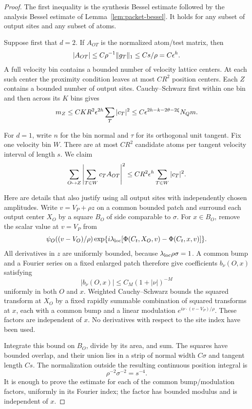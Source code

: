 \begin{proof}
The first inequality is the synthesis Bessel estimate followed by
the analysis Bessel estimate of Lemma~\ref{lem:packet-bessel}.
It holds for any subset of output sites and any subset of atoms.

Suppose first that \(d=2\).  If \(A_{OT}\) is the normalized
atom/test matrix, then
\[
 |A_{OT}|\leq C\rho^{-1}\|g_T\|_1
          \leq C s/\rho=C\epsilon^h.
\]
A full velocity bin contains a bounded number of velocity lattice
centers.  At each such center the proximity condition leaves at
most \(CR^2\) position centers.  Each \(Z\) contains a bounded
number of output sites.  Cauchy--Schwarz first within one bin
and then across its \(K\) bins gives
\[
 m_Z\leq CKR^2\epsilon^{2h}\sum_T|c_T|^2
       \leq C\epsilon^{2h-k-2\theta-2\xi}N_Qm.
\]

For \(d=1\), write \(n\) for the bin normal and \(\tau\) for its
orthogonal unit tangent.  Fix one velocity bin \(W\).
There are at most \(CR^2\) candidate atoms per tangent velocity
interval of length \(s\).  We claim
\begin{equation}
 \sum_{O\mapsto Z}\left|
       \sum_{T\in W}c_T A_{OT}\right|^2
 \leq CR^2\epsilon^h\sum_{T\in W}|c_T|^2.
 \label{eq:one-bin-strip}
\end{equation}

Here are details that also justify using all output sites with
independently chosen amplitudes.  Write \(v=V_P+\rho z\) on a
common bounded patch and surround each output center \(X_O\)
by a square \(B_O\) of side comparable to \(\sigma\).
For \(x\in B_O\), remove the scalar value at \(v=V_P\) from
\[
 \psi_O((v-V_O)/\rho)
 \exp\{i\lambda_{\rm loc}
       [\Phi(C_t,X_O,v)-\Phi(C_t,x,v)]\}.
\]
All derivatives in \(z\) are uniformly bounded, because
\(\lambda_{\rm loc}\rho\sigma=1\).
A common bump and a Fourier series on a fixed enlarged patch
therefore give coefficients \(b_\nu(O,x)\) satisfying
\[
 |b_\nu(O,x)|\leq C_M(1+|\nu|)^{-M}
\]
uniformly in both \(O\) and \(x\).
Weighted Cauchy--Schwarz bounds the squared transform at \(X_O\)
by a fixed rapidly summable combination of squared transforms
at \(x\), each with a common bump and a linear modulation
\(e^{i\nu\cdot(v-V_P)/\rho}\).
These factors are independent of \(x\).
No derivatives with respect to the site index have been used.

Integrate this bound on \(B_O\), divide by its area, and sum.
The squares have bounded overlap, and their union lies in a
strip of normal width \(C\sigma\) and tangent length \(Cs\).
The normalization outside the resulting continuous position
integral is
\begin{equation}
 \rho^{-2}\sigma^{-2}=s^{-4}.
 \label{eq:strip-normalization}
\end{equation}
It is enough to prove the estimate for each of the common
bump/modulation factors, uniformly in its Fourier index; the
factor has bounded modulus and is independent of \(x\).


\end{proof}
